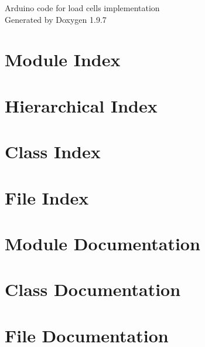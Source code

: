 \documentclass[twoside]{book}
\newcommand{\+}{\discretionary{\mbox{\scriptsize$\hookleftarrow$}}{}{}}
\newcommand{\clearemptydoublepage}{%
    \newpage{\pagestyle{empty}\cleardoublepage}%
  }
\begin{document}
  \raggedbottom
    \hypersetup{pageanchor=false,
                bookmarksnumbered=true,
                pdfencoding=unicode
               }
  \begin{titlepage}
  \vspace*{7cm}
  \begin{center}%
  {\Large Arduino code for load cells implementation}\\
  \vspace*{1cm}
  {\large Generated by Doxygen 1.9.7}\\
  \end{center}
  \end{titlepage}
  \clearemptydoublepage
  \tableofcontents
  \clearemptydoublepage
  \hypersetup{pageanchor=true}




\chapter{Module Index}

\chapter{Hierarchical Index}

\chapter{Class Index}

\chapter{File Index}

\chapter{Module Documentation}

\chapter{Class Documentation}


\chapter{File Documentation}




  \backmatter
  \newpage
  \clearemptydoublepage
  \printindex
\end{document}
